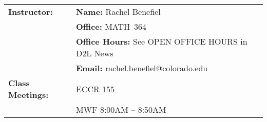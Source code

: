 \documentclass[11pt]{article}
\begin{document}
\begin{longtable}{lp{5.2in}}
%
\textbf{Instructor:}
   & {\bf Name:}     \hspace{8.00ex} Rachel Benefiel
   \\
   & {\bf Office:}    \hspace{8.25ex} MATH~364
   \\
   & {\bf Office Hours:} \hspace{.20ex} See OPEN OFFICE HOURS in D2L News
   \\
   & {\bf Email:}    \hspace{8.00ex} rachel.benefiel@colorado.edu
   \\[6pt]
%

\textbf{Class Meetings:}
   &  ECCR 155
   \\
   &  MWF 8:00\/AM -- 8:50\/AM 
  \\[6pt]


\end{longtable}
\end{document}
